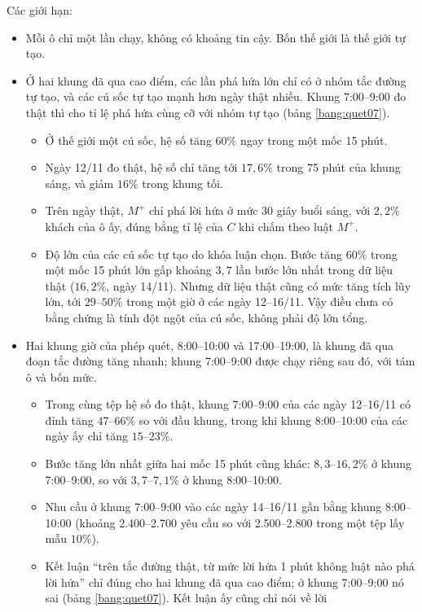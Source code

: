 Các giới hạn:
\begin{itemize}
\item Mỗi ô chỉ một lần chạy, không có khoảng tin cậy. Bốn thế giới là thế giới tự tạo.
\item Ở hai khung đã qua cao điểm, các lần phá hứa lớn chỉ có ở nhóm tắc đường tự tạo, và các cú sốc tự tạo
mạnh hơn ngày thật nhiều. Khung 7:00--9:00 đo thật thì cho tỉ lệ phá hứa cùng cỡ với nhóm tự tạo (bảng
\ref{bang:quet07}).
  \begin{itemize}
  \item Ở thế giới một cú sốc, hệ số tăng $60\%$ ngay trong một mốc 15 phút.
  \item Ngày 12/11 đo thật, hệ số chỉ tăng tới $17{,}6\%$ trong 75 phút của khung sáng, và giảm $16\%$
  trong khung tối.
  \item Trên ngày thật, $M^{+}$ chỉ phá lời hứa ở mức 30 giây buổi sáng, với $2{,}2\%$ khách của ô ấy,
  đúng bằng tỉ lệ của $C$ khi chấm theo luật $M^{+}$.
  \item Độ lớn của các cú sốc tự tạo do khóa luận chọn. Bước tăng $60\%$ trong một mốc 15 phút lớn gấp
  khoảng $3{,}7$ lần bước lớn nhất trong dữ liệu thật ($16{,}2\%$, ngày 14/11). Nhưng dữ liệu thật cũng
  có mức tăng tích lũy lớn, tới $29$--$50\%$ trong một giờ ở các ngày 12--16/11. Vậy điều chưa có bằng
  chứng là tính đột ngột của cú sốc, không phải độ lớn tổng.
  \end{itemize}
\item Hai khung giờ của phép quét, 8:00--10:00 và 17:00--19:00, là khung đã qua đoạn tắc đường tăng nhanh;
khung 7:00--9:00 được chạy riêng sau đó, với tám ô và bốn mức.
  \begin{itemize}
  \item Trong cùng tệp hệ số đo thật, khung 7:00--9:00 của các ngày 12--16/11 có đỉnh tăng
  $47$--$66\%$ so với đầu khung, trong khi khung 8:00--10:00 của các ngày ấy chỉ tăng $15$--$23\%$.
  \item Bước tăng lớn nhất giữa hai mốc 15 phút cũng khác: $8{,}3$--$16{,}2\%$ ở khung 7:00--9:00,
  so với $3{,}7$--$7{,}1\%$ ở khung 8:00--10:00.
  \item Nhu cầu ở khung 7:00--9:00 vào các ngày 14--16/11 gần bằng khung 8:00--10:00 (khoảng 2.400--2.700
  yêu cầu so với 2.500--2.800 trong một tệp lấy mẫu $10\%$).
  \item Kết luận ``trên tắc đường thật, từ mức lời hứa 1 phút không luật nào phá lời hứa'' chỉ đúng cho hai
  khung đã qua cao điểm; ở khung 7:00--9:00 nó sai (bảng \ref{bang:quet07}). Kết luận ấy cũng chỉ nói về lời

\end{itemize}
\end{itemize}
